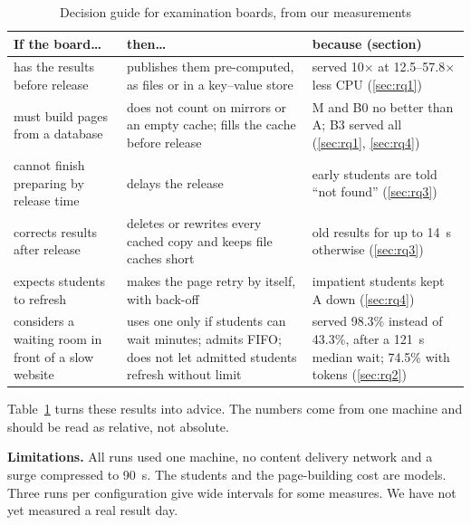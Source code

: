 \begin{table}[t]
\caption{Decision guide for examination boards, from our measurements}
\label{tab:guide}
\centering
\footnotesize
\setlength{\tabcolsep}{3pt}
\begin{tabular}{@{}>{\raggedright\arraybackslash}p{2.5cm}>{\raggedright\arraybackslash}p{3.1cm}>{\raggedright\arraybackslash}p{2.3cm}@{}}
\toprule
If the board\ldots & then\ldots & because (section)\\
\midrule
has the results before release & publishes them pre-computed, as files or in a key--value store & served 10$\times$ at 12.5--57.8$\times$ less CPU (\ref{sec:rq1})\\
must build pages from a database & does not count on mirrors or an empty cache; fills the cache before release & M and B0 no better than A; B3 served all (\ref{sec:rq1}, \ref{sec:rq4})\\
cannot finish preparing by release time & delays the release & early students are told ``not found'' (\ref{sec:rq3})\\
corrects results after release & deletes or rewrites every cached copy and keeps file caches short & old results for up to \SI{14}{s} otherwise (\ref{sec:rq3})\\
expects students to refresh & makes the page retry by itself, with back-off & impatient students kept A down (\ref{sec:rq4})\\
considers a waiting room in front of a slow website & uses one only if students can wait minutes; admits FIFO; does not let admitted students refresh without limit & served 98.3\% instead of 43.3\%, after a \SI{121}{s} median wait; 74.5\% with tokens (\ref{sec:rq2})\\
\bottomrule
\end{tabular}
\end{table}

Table~\ref{tab:guide} turns these results into advice. The numbers come from
one machine and should be read as relative, not absolute.

\textbf{Limitations.} All runs used one machine, no content delivery network
and a surge compressed to \SI{90}{s}. The students and the page-building cost
are models. Three runs per configuration give wide intervals for some
measures. We have not yet measured a real result day.
